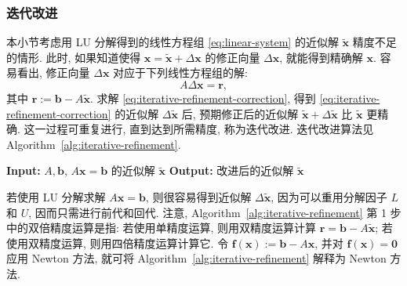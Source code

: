 \subsubsection{{迭代改进}}\label{subsec:iterative-refinement}
{本小节考虑用 LU 分解得到的线性方程组 \eqref{eq:linear-system} 的近似解 $\tilde{\bm x}$ 精度不足的情形.}
{此时, 如果知道使得 $\bm x=\tilde{\bm x}+\Delta\bm x$ 的修正向量 $\Delta\bm x$, 就能得到精确解 $\bm x$. 容易看出, 修正向量 $\Delta\bm x$ 对应于下列线性方程组的解:}
\begin{equation}\label{eq:iterative-refinement-correction}A\Delta\bm x=\bm r,\end{equation}
{其中 $\bm r:=\bm b-A\tilde{\bm x}$. 求解 \eqref{eq:iterative-refinement-correction}, 得到 \eqref{eq:iterative-refinement-correction} 的近似解 $\Delta\tilde{\bm x}$ 后, 预期修正后的近似解 $\tilde{\bm x}+\Delta\tilde{\bm x}$ 比 $\tilde{\bm x}$ 更精确. 这一过程可重复进行, 直到达到所需精度, 称为迭代改进. 迭代改进算法见 Algorithm~\ref{alg:iterative-refinement}.}
\begin{algorithm}[H]
\caption{{$A\bm x=\bm b$ 的迭代改进}}\label{alg:iterative-refinement}
\begin{algorithmic}[1]
\Statex \textbf{Input:} $A,\bm b$, {$A\bm x=\bm b$ 的近似解 $\tilde{\bm x}$}
\Statex \textbf{Output:} {改进后的近似解 $\tilde{\bm x}$}
\end{algorithmic}
\end{algorithm}
{若使用 LU 分解求解 $A\bm x=\bm b$, 则很容易得到近似解 $\Delta\tilde{\bm x}$, 因为可以重用分解因子 $L$ 和 $U$, 因而只需进行前代和回代.}
{注意, Algorithm~\ref{alg:iterative-refinement} 第 1 步中的双倍精度运算是指: 若使用单精度运算, 则用双精度运算计算 $\bm r=\bm b-A\tilde{\bm x}$; 若使用双精度运算, 则用四倍精度运算计算它.}
{令 $\bm f(\bm x):=\bm b-A\bm x$, 并对 $\bm f(\bm x)=\bm0$ 应用 Newton 方法, 就可将 Algorithm~\ref{alg:iterative-refinement} 解释为 Newton 方法.}
